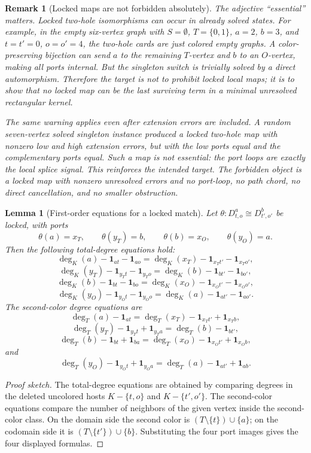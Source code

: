 \documentclass[11pt]{article}
\newtheorem{lemma}{Lemma}
\newtheorem{remark}{Remark}
\newcommand{\one}{\mathbf{1}}
\begin{document}
\begin{remark}[Locked maps are not forbidden absolutely]
The adjective ``essential'' matters.  Locked two-hole isomorphisms can occur
in already solved states.  For example, in the empty six-vertex graph with
\(S=\emptyset\), \(T=\{0,1\}\), \(a=2\), \(b=3\), and \(t=t'=0\),
\(o=o'=4\), the two-hole cards are just colored empty graphs.  A
color-preserving bijection can send \(a\) to the remaining \(T\)-vertex and
\(b\) to an \(O\)-vertex, making all ports internal.  But the singleton
switch is trivially solved by a direct automorphism.  Therefore the target is
not to prohibit locked local maps; it is to show that no locked map can be
the last surviving term in a minimal unresolved rectangular kernel.

The same warning applies even after extension errors are included.  A random
seven-vertex solved singleton instance produced a locked two-hole map with
nonzero low and high extension errors, but with the low ports equal and the
complementary ports equal.  Such a map is not essential: the port loops are
exactly the local splice signal.  This reinforces the intended target.  The
forbidden object is a locked map with nonzero unresolved errors and no
port-loop, no path chord, no direct cancellation, and no smaller obstruction.
\end{remark}

\begin{lemma}[First-order equations for a locked match]
Let \(\theta:D_{t,o}^a\cong D_{t',o'}^b\) be locked, with ports
\[
  \theta(a)=x_T,\qquad \theta(y_T)=b,
  \qquad
  \theta(b)=x_O,\qquad \theta(y_O)=a.
\]
Then the following total-degree equations hold:
\[
  \deg_K(a)-\one_{at}-\one_{ao}
  =
  \deg_K(x_T)-\one_{x_Tt'}-\one_{x_To'},
\]
\[
  \deg_K(y_T)-\one_{y_Tt}-\one_{y_To}
  =
  \deg_K(b)-\one_{bt'}-\one_{bo'},
\]
\[
  \deg_K(b)-\one_{bt}-\one_{bo}
  =
  \deg_K(x_O)-\one_{x_Ot'}-\one_{x_Oo'},
\]
\[
  \deg_K(y_O)-\one_{y_Ot}-\one_{y_Oo}
  =
  \deg_K(a)-\one_{at'}-\one_{ao'}.
\]
The second-color degree equations are
\[
  \deg_T(a)-\one_{at}
  =
  \deg_T(x_T)-\one_{x_Tt'}+\one_{x_Tb},
\]
\[
  \deg_T(y_T)-\one_{y_Tt}+\one_{y_Ta}
  =
  \deg_T(b)-\one_{bt'},
\]
\[
  \deg_T(b)-\one_{bt}+\one_{ba}
  =
  \deg_T(x_O)-\one_{x_Ot'}+\one_{x_Ob},
\]
and
\[
  \deg_T(y_O)-\one_{y_Ot}+\one_{y_Oa}
  =
  \deg_T(a)-\one_{at'}+\one_{ab}.
\]
\end{lemma}

\begin{proof}[Proof sketch]
The total-degree equations are obtained by comparing degrees in the deleted
uncolored hosts \(K-\{t,o\}\) and \(K-\{t',o'\}\).  The second-color
equations compare the number of neighbors of the given vertex inside the
second-color class.  On the domain side the second color is
\((T\setminus\{t\})\cup\{a\}\); on the codomain side it is
\((T\setminus\{t'\})\cup\{b\}\).  Substituting the four port images gives the
four displayed formulas.
\end{proof}
\end{document}
